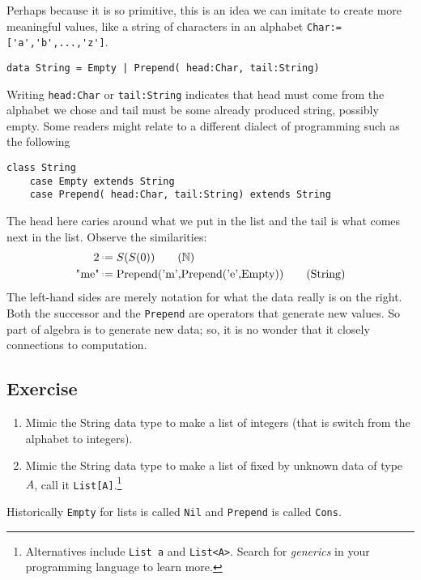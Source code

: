 Perhaps because it is so primitive, this is an idea we 
can imitate to create more meaningful values, like a string 
of characters in an alphabet \lstinline{Char:=['a','b',...,'z']}.
\begin{lstlisting}[language=Hidris]
data String = Empty | Prepend( head:Char, tail:String) 
\end{lstlisting}
Writing \lstinline{head:Char} or \lstinline{tail:String} 
indicates that head must come from the alphabet we chose 
and tail must be some already produced string, possibly empty.
Some readers might relate to a different dialect of 
programming such as the following
\begin{lstlisting}[language=Sava]
class String
    case Empty extends String
    case Prepend( head:Char, tail:String) extends String
\end{lstlisting}
The head here caries around what we put in the list and the tail 
is what comes next in the list.  Observe the similarities:
\begin{align}
     2 & \defeq S(S(0)) \tag{$\mathbb{N}$}\\
 \text{\lstinline{"me"}} & \defeq \text{\lstinline{Prepend('m',Prepend('e',Empty))}}
\tag{String}
\end{align}
The left-hand sides are merely notation for what the data really is on the right.
Both the successor and the \lstinline{Prepend} are operators that generate 
new values.  So part of algebra is to generate new data; so, it is no wonder 
that it closely connections to computation.

\subsection*{Exercise}
\begin{enumerate}
    \item Mimic the String data type to make a list of integers (that is 
    switch from the alphabet to integers).

    \item Mimic the String data type to make a list of fixed by 
    unknown data of type $A$, call it \lstinline{List[A]}.\footnote{
    Alternatives include \lstinline{List a} and \lstinline{List<A>}. 
    Search for \emph{generics} in your programming language to learn more.
    }

\end{enumerate}
Historically \lstinline{Empty} for lists is called \lstinline{Nil} 
and \lstinline{Prepend} is called \lstinline{Cons}.


